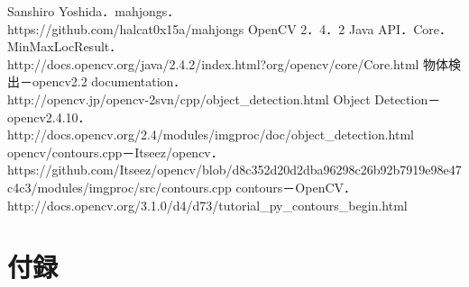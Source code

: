\documentclass{jsarticle}
\begin{document}
\newpage

\begin{thebibliography}{9}
	Sanshiro Yoshida．mahjongs．\\
	https://github.com/halcat0x15a/mahjongs
	OpenCV 2．4．2 Java API．Core．MinMaxLocResult．\\
	http://docs.opencv.org/java/2.4.2/index.html?org/opencv/core/Core.html
	物体検出－opencv2.2 documentation． \\
	http://opencv.jp/opencv-2svn/cpp/object\_detection.html
	Object Detection－opencv2.4.10．\\
	http://docs.opencv.org/2.4/modules/imgproc/doc/object\_detection.html
	opencv/contours.cpp－Itseez/opencv． \\
	https://github.com/Itseez/opencv/blob/d8c352d20d2dba96298c26b92b7919e98e47c4c3/modules/imgproc/src/contours.cpp
   contours－OpenCV． \\
   http://docs.opencv.org/3.1.0/d4/d73/tutorial\_py\_contours\_begin.html
\end{thebibliography}



\newpage

\section{付録}
\end{document}
